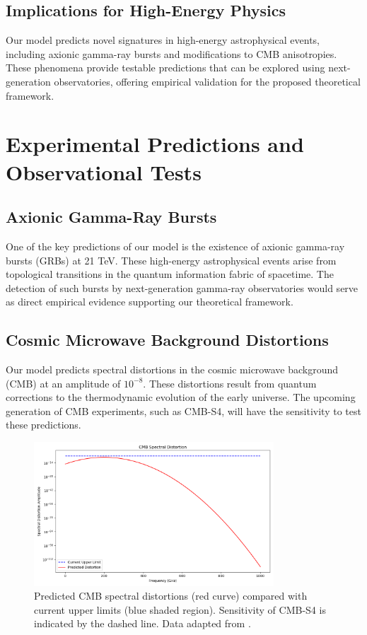 \documentclass[12pt]{article}
\begin{document}
\subsection{Implications for High-Energy Physics}
Our model predicts novel signatures in high-energy astrophysical events, including axionic gamma-ray bursts and modifications to CMB anisotropies. These phenomena provide testable predictions that can be explored using next-generation observatories, offering empirical validation for the proposed theoretical framework.

\section{Experimental Predictions and Observational Tests}
\subsection{Axionic Gamma-Ray Bursts}
One of the key predictions of our model is the existence of axionic gamma-ray bursts (GRBs) at 21 TeV. These high-energy astrophysical events arise from topological transitions in the quantum information fabric of spacetime. The detection of such bursts by next-generation gamma-ray observatories would serve as direct empirical evidence supporting our theoretical framework.

\subsection{Cosmic Microwave Background Distortions}
Our model predicts spectral distortions in the cosmic microwave background (CMB) at an amplitude of $10^{-8}$. These distortions result from quantum corrections to the thermodynamic evolution of the early universe. The upcoming generation of CMB experiments, such as CMB-S4, will have the sensitivity to test these predictions.

\begin{figure}[h!]
    \centering
    \includegraphics[width=0.8\textwidth]{cmb_spectral_distortion.png} %
    \caption{Predicted CMB spectral distortions (red curve) compared with current upper limits (blue shaded region). Sensitivity of CMB-S4 is indicated by the dashed line. Data adapted from \cite{CMB-S42023}.}
    \label{fig:cmb_spectral_distortion}
\end{figure}
\end{document}
